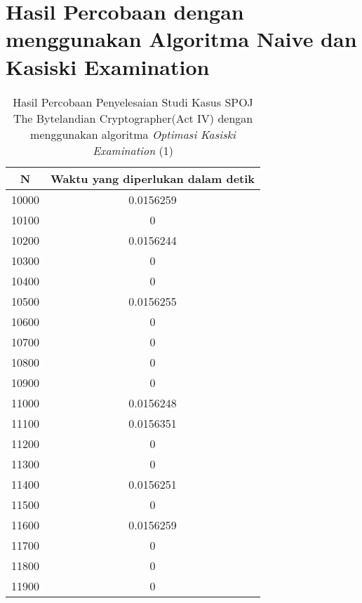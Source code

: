 \chapter{Hasil Percobaan dengan menggunakan Algoritma Naive dan Kasiski Examination}
\begin{table}[H]
\centering
\begin{tabular}{|c|c|}\hline
N&Waktu yang diperlukan dalam detik\\ \hline
10000&0.0156259\\ \hline
10100&0\\ \hline
10200&0.0156244\\ \hline
10300&0\\ \hline
10400&0\\ \hline
10500&0.0156255\\ \hline
10600&0\\ \hline
10700&0\\ \hline
10800&0\\ \hline
10900&0\\ \hline
11000&0.0156248\\ \hline
11100&0.0156351\\ \hline
11200&0\\ \hline
11300&0\\ \hline
11400&0.0156251\\ \hline
11500&0\\ \hline
11600&0.0156259\\ \hline
11700&0\\ \hline
11800&0\\ \hline
11900&0\\ \hline
\end{tabular}
\caption {Hasil Percobaan Penyelesaian Studi Kasus SPOJ The Bytelandian Cryptographer(Act IV) dengan menggunakan algoritma \textit{Optimasi Kasiski Examination} (1)}
\label{tab:res2}
\end{table}
